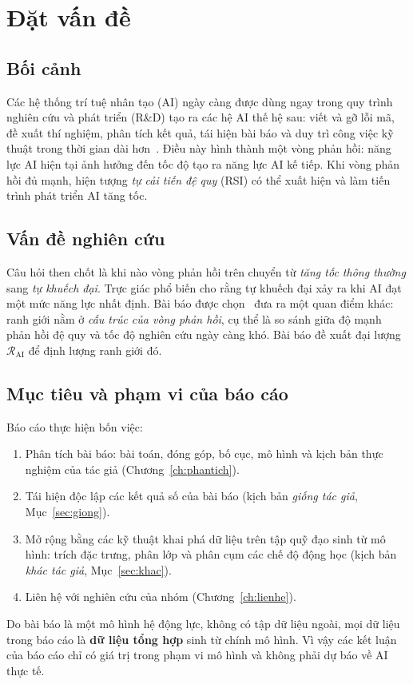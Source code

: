 \documentclass[12pt,a4paper,openany]{report}
\numberwithin{equation}{chapter}   %
\theoremstyle{definition}
\newcommand{\RAI}{\mathcal{R}_{\mathrm{AI}}}
\begin{document}
\chapter{Đặt vấn đề}\label{ch:datvande}
\section{Bối cảnh}
Các hệ thống trí tuệ nhân tạo (AI) ngày càng được dùng ngay trong quy trình nghiên cứu và phát triển (R\&D) tạo ra các hệ AI thế hệ sau: viết và gỡ lỗi mã, đề xuất thí nghiệm, phân tích kết quả, tái hiện bài báo và duy trì công việc kỹ thuật trong thời gian dài hơn~\cite{burtsev2026}. Điều này hình thành một vòng phản hồi: năng lực AI hiện tại ảnh hưởng đến tốc độ tạo ra năng lực AI kế tiếp. Khi vòng phản hồi đủ mạnh, hiện tượng \emph{tự cải tiến đệ quy} (RSI) có thể xuất hiện và làm tiến trình phát triển AI tăng tốc.

\section{Vấn đề nghiên cứu}
Câu hỏi then chốt là khi nào vòng phản hồi trên chuyển từ \emph{tăng tốc thông thường} sang \emph{tự khuếch đại}. Trực giác phổ biến cho rằng tự khuếch đại xảy ra khi AI đạt một mức năng lực nhất định. Bài báo được chọn~\cite{burtsev2026} đưa ra một quan điểm khác: ranh giới nằm ở \emph{cấu trúc của vòng phản hồi}, cụ thể là so sánh giữa độ mạnh phản hồi đệ quy và tốc độ nghiên cứu ngày càng khó. Bài báo đề xuất đại lượng $\RAI$ để định lượng ranh giới đó.

\section{Mục tiêu và phạm vi của báo cáo}
Báo cáo thực hiện bốn việc:
\begin{enumerate}[label=(\roman*)]
  \item Phân tích bài báo: bài toán, đóng góp, bố cục, mô hình và kịch bản thực nghiệm của tác giả (Chương~\ref{ch:phantich}).
  \item Tái hiện độc lập các kết quả số của bài báo (kịch bản \emph{giống tác giả}, Mục~\ref{sec:giong}).
  \item Mở rộng bằng các kỹ thuật khai phá dữ liệu trên tập quỹ đạo sinh từ mô hình: trích đặc trưng, phân lớp và phân cụm các chế độ động học (kịch bản \emph{khác tác giả}, Mục~\ref{sec:khac}).
  \item Liên hệ với nghiên cứu của nhóm (Chương~\ref{ch:lienhe}).
\end{enumerate}
Do bài báo là một mô hình hệ động lực, không có tập dữ liệu ngoài, mọi dữ liệu trong báo cáo là \textbf{dữ liệu tổng hợp} sinh từ chính mô hình. Vì vậy các kết luận của báo cáo chỉ có giá trị trong phạm vi mô hình và không phải dự báo về AI thực tế.
\end{document}

